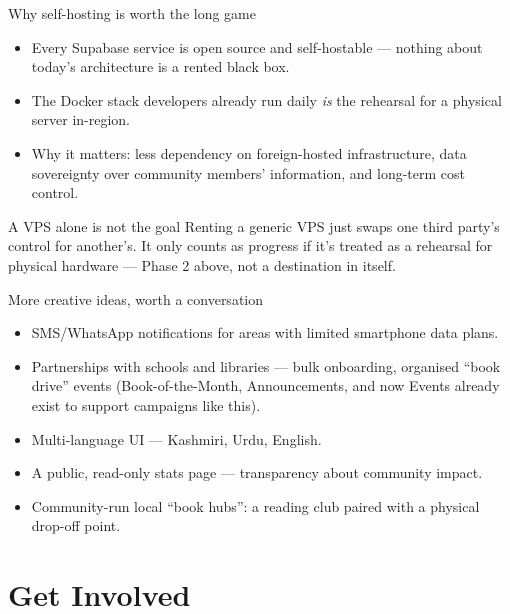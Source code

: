 \documentclass[aspectratio=169,11pt]{beamer}
\begin{document}
\begin{frame}{Why self-hosting is worth the long game}
  \begin{itemize}
    \item Every Supabase service is open source and self-hostable --- nothing about today's architecture is a rented black box.
    \item The Docker stack developers already run daily \emph{is} the rehearsal for a physical server in-region.
    \item Why it matters: less dependency on foreign-hosted infrastructure, data sovereignty over community members' information, and long-term cost control.
  \end{itemize}
  \vfill
  \begin{block}{A VPS alone is not the goal}
    Renting a generic VPS just swaps one third party's control for another's. It only counts as progress if it's treated as a rehearsal for physical hardware --- Phase 2 above, not a destination in itself.
  \end{block}
\end{frame}

\begin{frame}{More creative ideas, worth a conversation}
  \begin{itemize}
    \item SMS/WhatsApp notifications for areas with limited smartphone data plans.
    \item Partnerships with schools and libraries --- bulk onboarding, organised ``book drive'' events (Book-of-the-Month, Announcements, and now Events already exist to support campaigns like this).
    \item Multi-language UI --- Kashmiri, Urdu, English.
    \item A public, read-only stats page --- transparency about community impact.
    \item Community-run local ``book hubs'': a reading club paired with a physical drop-off point.
  \end{itemize}
\end{frame}

\section{Get Involved}
\end{document}
